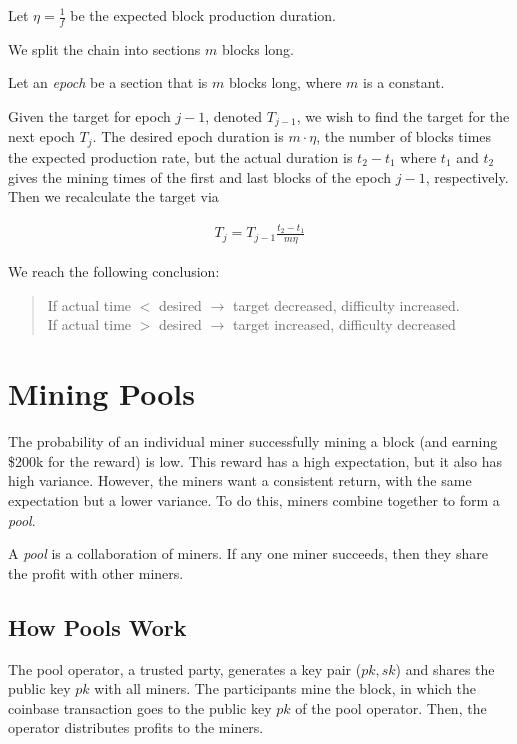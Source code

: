\begin{definition}
Let $\eta = \frac{1}{f}$ be the expected block production duration.
\end{definition}
We split the chain into sections $m$ blocks long.
\begin{definition}
Let an \textit{epoch} be a section that is $m$ blocks long, where $m$ is a constant.
\end{definition}
Given the target for epoch $j-1$, denoted $T_{j-1}$, we wish to find the target for the next epoch $T_j$. The desired epoch duration is $m\cdot \eta$, the number of blocks times the expected production rate, but the actual duration is $t_2-t_1$ where $t_1$ and $t_2$ gives the mining times of the first and last blocks of the epoch $j-1$, respectively. Then we recalculate the target via

\begin{align*}
    T_j = T_{j-1}\frac{t_2 - t_1}{m\eta}
\end{align*}

We reach the following conclusion:
\begin{quote}
If actual time $<$ desired $\longrightarrow$ target decreased, difficulty increased.\\
If actual time $>$ desired $\longrightarrow$ target increased, difficulty decreased
\end{quote}

\section{Mining Pools}
The probability of an individual miner successfully mining a block (and earning \$200k for the reward) is low. This reward has a high expectation, but it also has high variance. However, the miners want a consistent return, with the same expectation but a lower variance. To do this, miners combine together to form a \textit{pool}.

\begin{definition}
A \textit{pool} is a collaboration of miners. If any one miner succeeds, then they share the profit with other miners.
\end{definition}

\subsection{How Pools Work}
The pool operator, a trusted party, generates a key pair ($pk, sk$) and shares the public key $pk$ with all miners. The participants mine the block, in which the coinbase transaction goes to the public key $pk$ of the pool operator. Then, the operator distributes profits to the miners.

